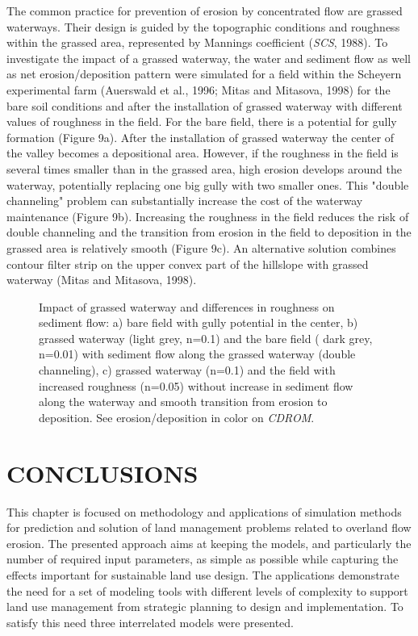 \documentclass{kapedbk} %
\begin{document}
\medskip
The common practice for prevention of erosion by
concentrated flow are grassed waterways. Their design is guided by the topographic
conditions and roughness within the grassed area, represented
by Mannings coefficient ({\sl SCS}, 1988). To investigate the impact
of a grassed waterway, the water and sediment flow as well as net
erosion/deposition pattern were simulated for a field within
the Scheyern experimental farm (Auerswald et al., 1996; Mitas and Mitasova, 1998)
for the bare soil conditions and after the installation
of grassed waterway with different values of roughness in the field.
For the bare field, there is a potential for gully formation
 (Figure 9a). After the installation
of grassed waterway the center of the valley
becomes a depositional area. However, if the roughness in the
field is several times smaller than in the grassed area, high
erosion develops around the waterway, potentially replacing one big
gully with two smaller ones. This "double
channeling" problem can substantially increase the cost of the waterway
 maintenance (Figure 9b). Increasing the roughness in the field
reduces the risk of double channeling and the transition
from erosion in the field to deposition in the grassed area is
relatively smooth (Figure 9c). An alternative solution combines contour
filter strip on the upper convex part of the hillslope with grassed
waterway (Mitas and Mitasova, 1998).

\begin{figure}[h]
\centerline{}
\caption{Impact of grassed waterway and differences in roughness
on sediment flow: a) bare field with gully potential in the center,
b) grassed waterway (light grey, n=0.1) and the bare field ( dark grey, n=0.01) 
with sediment flow along the grassed waterway (double channeling), 
c) grassed waterway (n=0.1) and the field with increased roughness
(n=0.05) without increase in sediment flow along the waterway
and smooth transition from erosion to deposition. See erosion/deposition 
in color on {\sl CDROM}.}
\end{figure}


\bigskip \noindent
\section{CONCLUSIONS}

This chapter is focused on methodology and applications of simulation
methods for prediction and solution of
 land management problems related to overland flow erosion.
The presented approach aims at
keeping the models, and particularly the number of required
input parameters, as simple as possible
while capturing the effects important for sustainable
land use design.
The applications demonstrate the need for a set of modeling
tools with different levels of complexity to support land use management
from strategic planning to design and implementation.
To satisfy this need three interrelated models were presented.
\end{document}
